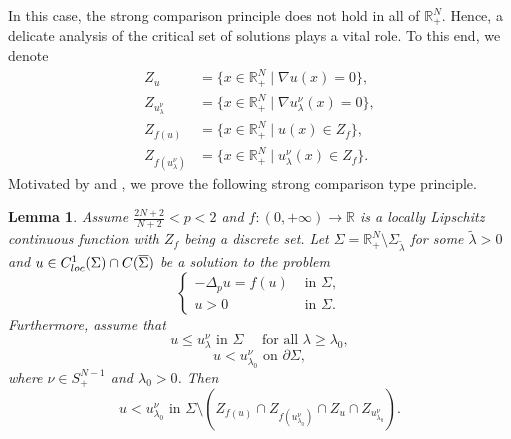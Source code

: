 \documentclass[reqno]{amsart}
\theoremstyle{plain}
\newtheorem{lemma}[theorem]{Lemma}
\theoremstyle{definition}
\theoremstyle{remark}
\begin{document}
	In this case, the strong comparison principle does not hold in all of $\mathbb{R}^N_+$. Hence, a delicate analysis of the critical set of solutions plays a vital role.
	To this end, we denote
	\begin{align*}
		Z_u&=\{x\in\mathbb{R}^N_+ \mid \nabla u(x) = 0\},\\
		Z_{u_\lambda^\nu}&=\{x\in\mathbb{R}^N_+ \mid \nabla u_\lambda^\nu(x) = 0\},\\
		Z_{f(u)}&=\{x\in\mathbb{R}^N_+ \mid u(x) \in Z_f\},\\
		Z_{f(u_\lambda^\nu)}&=\{x\in\mathbb{R}^N_+ \mid u_\lambda^\nu(x) \in Z_f\}.
	\end{align*}
	Motivated by \cite[Proposition 4.3]{MR4377321} and \cite[Lemma 13]{MR4771444}, we prove the following strong comparison type principle.
	\begin{lemma}\label{lem:limit_case}
		Assume $\frac{2N+2}{N+2}<p<2$ and $f:(0,+\infty)\to\mathbb{R}$ is a locally Lipschitz continuous function with $Z_f$ being a discrete set. Let $\Sigma=\mathbb{R}^N_+\setminus\Sigma_{\tilde{\lambda}}$ for some $\tilde{\lambda}>0$ and $u \in C^1_{\rm loc}(\Sigma) \cap C(\overline{\Sigma})$ be a solution to the problem
		\[
		\begin{cases}
			-\Delta_p u = f(u) & \text{ in } \Sigma,\\
			u>0 & \text{ in } \Sigma.
		\end{cases}
		\]
		Furthermore, assume that
		\begin{equation}\label{u_monotone}
			u \le u_\lambda^\nu \text{ in }\Sigma \quad\text{ for all } \lambda \ge \lambda_0,
		\end{equation}
		\begin{equation}\label{u_monotone2}
			u < u_{\lambda_0}^\nu \text{ on } \partial\Sigma,
		\end{equation}
		where $\nu\in S^{N-1}_+$ and $\lambda_0>0$.
		Then
		\[
		u < u_{\lambda_0}^\nu \text{ in } \Sigma \setminus \left(Z_{f(u)} \cap Z_{f(u_{\lambda_0}^\nu)} \cap Z_u \cap Z_{u_{\lambda_0}^\nu}\right).
		\]
	\end{lemma}
	
\end{document}

